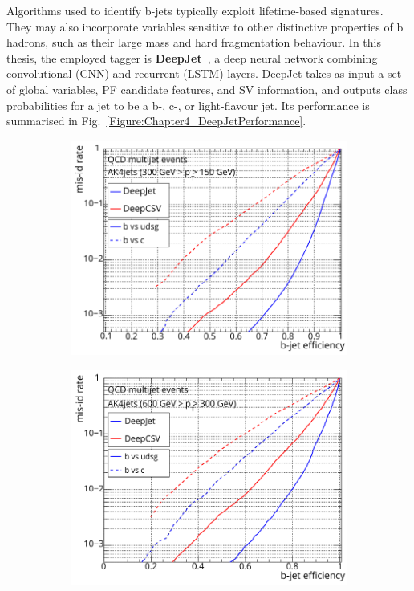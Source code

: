Algorithms used to identify b-jets typically exploit lifetime-based signatures. They may also incorporate variables sensitive to other distinctive properties of b hadrons, such as their large mass and hard fragmentation behaviour. In this thesis, the employed tagger is \textbf{DeepJet}~\cite{DeepJet}, a deep neural network combining convolutional (CNN) and recurrent (LSTM) layers. DeepJet takes as input a set of global variables, PF candidate features, and SV information, and outputs class probabilities for a jet to be a b-, c-, or light-flavour jet. Its performance is summarised in Fig.~\ref{Figure:Chapter4_DeepJetPerformance}.

\begin{figure}[h]
    \centering
    \begin{subfigure}[b]{0.49\textwidth}
        \centering
        \includegraphics[width=\textwidth]{Figures/Chapter4/deepJet_lowpt.pdf}
        \caption{}
    \end{subfigure}
    \begin{subfigure}[b]{0.49\textwidth}
        \centering
        \includegraphics[width=\textwidth]{Figures/Chapter4/deepjet_mediumpt.pdf}

\end{subfigure}
\end{figure}
